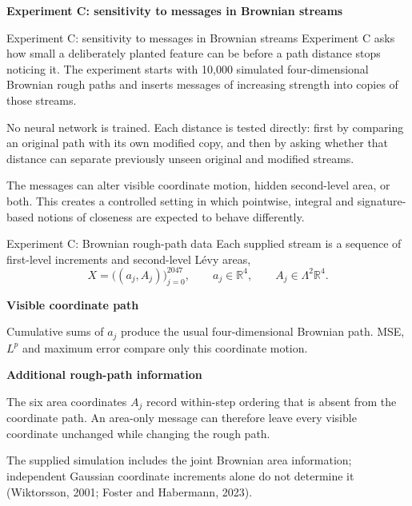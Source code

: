 \documentclass[aspectratio=169,9pt]{beamer}
\newcommand{\dividerframe}[1]{%
  \begin{frame}{\strut}%
    \vfill
    \centering
    {\usebeamercolor[fg]{frametitle}\huge\bfseries #1}\par
    \vfill
  \end{frame}%
}
\begin{document}
\dividerframe{Experiment C: sensitivity to messages in Brownian streams}

\begin{frame}{Experiment C: sensitivity to messages in Brownian streams}
  Experiment C asks how small a deliberately planted feature can be before a path distance stops noticing it. The experiment starts with 10,000 simulated four-dimensional Brownian rough paths and inserts messages of increasing strength into copies of those streams.

  No neural network is trained. Each distance is tested directly: first by comparing an original path with its own modified copy, and then by asking whether that distance can separate previously unseen original and modified streams.

  The messages can alter visible coordinate motion, hidden second-level area, or both. This creates a controlled setting in which pointwise, integral and signature-based notions of closeness are expected to behave differently.
\end{frame}

\begin{frame}{Experiment C: Brownian rough-path data}
  Each supplied stream is a sequence of first-level increments and second-level L\'evy areas,
  \[
    X=\bigl((a_j,A_j)\bigr)_{j=0}^{2047},
    \qquad a_j\in\mathbb R^4,
    \qquad A_j\in\Lambda^2\mathbb R^4.
  \]

  \textbf{Visible coordinate path}\par
  Cumulative sums of $a_j$ produce the usual four-dimensional Brownian path. MSE, $L^p$ and maximum error compare only this coordinate motion.

  \textbf{Additional rough-path information}\par
  The six area coordinates $A_j$ record within-step ordering that is absent from the coordinate path. An area-only message can therefore leave every visible coordinate unchanged while changing the rough path.

  The supplied simulation includes the joint Brownian area information; independent Gaussian coordinate increments alone do not determine it (Wiktorsson, 2001; Foster and Habermann, 2023).
\end{frame}
\end{document}
